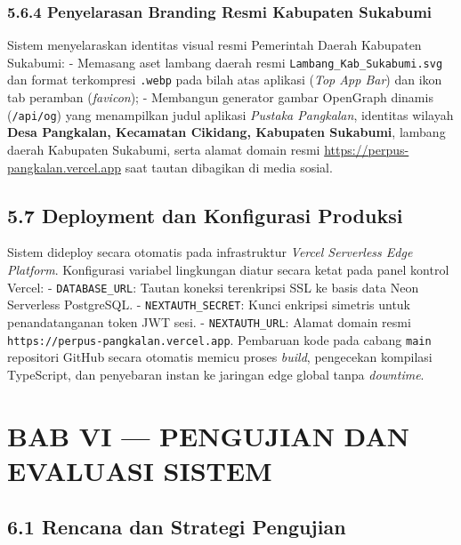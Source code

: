 \documentclass[
  indonesian,
  12pt,
]{report}
\begin{document}
\subsection{5.6.4 Penyelarasan Branding Resmi Kabupaten
Sukabumi}\label{penyelarasan-branding-resmi-kabupaten-sukabumi}

Sistem menyelaraskan identitas visual resmi Pemerintah Daerah Kabupaten
Sukabumi: - Memasang aset lambang daerah resmi
\texttt{Lambang\_Kab\_Sukabumi.svg} dan format terkompresi
\texttt{.webp} pada bilah atas aplikasi (\emph{Top App Bar}) dan ikon
tab peramban (\emph{favicon}); - Membangun generator gambar OpenGraph
dinamis (\texttt{/api/og}) yang menampilkan judul aplikasi \emph{Pustaka
Pangkalan}, identitas wilayah \textbf{Desa Pangkalan, Kecamatan
Cikidang, Kabupaten Sukabumi}, lambang daerah Kabupaten Sukabumi, serta
alamat domain resmi \url{https://perpus-pangkalan.vercel.app} saat
tautan dibagikan di media sosial.

\section{5.7 Deployment dan Konfigurasi
Produksi}\label{deployment-dan-konfigurasi-produksi}

Sistem dideploy secara otomatis pada infrastruktur \emph{Vercel
Serverless Edge Platform}. Konfigurasi variabel lingkungan diatur secara
ketat pada panel kontrol Vercel: - \texttt{DATABASE\_URL}: Tautan
koneksi terenkripsi SSL ke basis data Neon Serverless PostgreSQL. -
\texttt{NEXTAUTH\_SECRET}: Kunci enkripsi simetris untuk penandatanganan
token JWT sesi. - \texttt{NEXTAUTH\_URL}: Alamat domain resmi
\texttt{https://perpus-pangkalan.vercel.app}. Pembaruan kode pada cabang
\texttt{main} repositori GitHub secara otomatis memicu proses
\emph{build}, pengecekan kompilasi TypeScript, dan penyebaran instan ke
jaringan edge global tanpa \emph{downtime}.

\newpage

\chapter{BAB VI --- PENGUJIAN DAN EVALUASI
SISTEM}\label{bab-vi-pengujian-dan-evaluasi-sistem}

\section{6.1 Rencana dan Strategi
Pengujian}\label{rencana-dan-strategi-pengujian}
\end{document}
